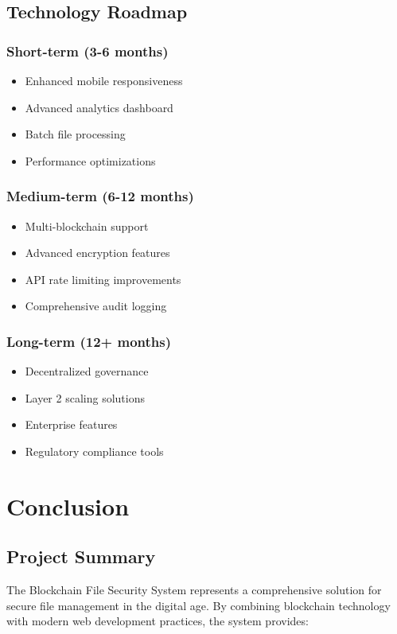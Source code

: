 \documentclass[11pt,a4paper]{article}
\begin{document}
\subsection{Technology Roadmap}

\subsubsection{Short-term (3-6 months)}
\begin{itemize}
    \item Enhanced mobile responsiveness
    \item Advanced analytics dashboard
    \item Batch file processing
    \item Performance optimizations
\end{itemize}

\subsubsection{Medium-term (6-12 months)}
\begin{itemize}
    \item Multi-blockchain support
    \item Advanced encryption features
    \item API rate limiting improvements
    \item Comprehensive audit logging
\end{itemize}

\subsubsection{Long-term (12+ months)}
\begin{itemize}
    \item Decentralized governance
    \item Layer 2 scaling solutions
    \item Enterprise features
    \item Regulatory compliance tools
\end{itemize}

\section{Conclusion}

\subsection{Project Summary}
The Blockchain File Security System represents a comprehensive solution for secure file management in the digital age. By combining blockchain technology with modern web development practices, the system provides:
\end{document}
